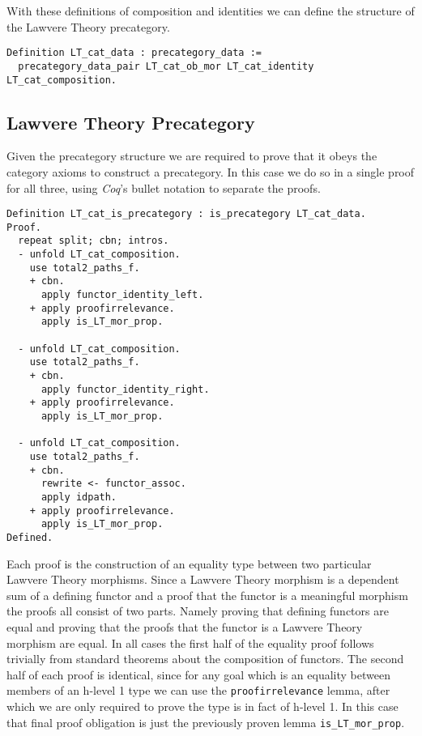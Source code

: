 With these definitions of composition and identities we can define the structure
of the Lawvere Theory precategory.
\begin{lstlisting}
Definition LT_cat_data : precategory_data := 
  precategory_data_pair LT_cat_ob_mor LT_cat_identity LT_cat_composition.
\end{lstlisting}

\subsection{Lawvere Theory Precategory}
Given the precategory structure we are required to prove that it obeys the
category axioms to construct a precategory. In this case we do so in a single
proof for all three, using \textit{Coq}'s bullet notation to separate the
proofs.
\begin{lstlisting}
Definition LT_cat_is_precategory : is_precategory LT_cat_data.
Proof.
  repeat split; cbn; intros.
  - unfold LT_cat_composition.
    use total2_paths_f.
    + cbn.
      apply functor_identity_left.
    + apply proofirrelevance.
      apply is_LT_mor_prop.

  - unfold LT_cat_composition.
    use total2_paths_f.
    + cbn.
      apply functor_identity_right.
    + apply proofirrelevance.
      apply is_LT_mor_prop.

  - unfold LT_cat_composition.
    use total2_paths_f.
    + cbn.
      rewrite <- functor_assoc.
      apply idpath.
    + apply proofirrelevance.
      apply is_LT_mor_prop.
Defined.
\end{lstlisting}

Each proof is the construction of an equality type between two particular
Lawvere Theory morphisms. Since a Lawvere Theory morphism is a dependent sum of
a defining functor and a proof that the functor is a meaningful morphism the
proofs all consist of two parts. Namely proving that defining functors are equal
and proving that the proofs that the functor is a Lawvere Theory morphism are
equal. In all cases the first half of the equality proof follows trivially from
standard theorems about the composition of functors. The second half of each
proof is identical, since for any goal which is an equality between members of
an h-level 1 type we can use the \verb|proofirrelevance| lemma, after which we
are only required to prove the type is in fact of h-level 1. In this case that
final proof obligation is just the previously proven lemma
\verb|is_LT_mor_prop|.

